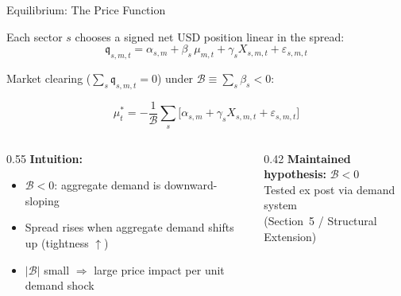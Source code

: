 \documentclass[aspectratio=169, 10pt]{beamer}
\newcommand{\calB}{\mathcal{B}}      %
\newcommand{\mustar}{\mu_t^{*}}      %
\begin{document}
\begin{frame}{Equilibrium: The Price Function}

  Each sector $s$ chooses a signed net USD position linear in the spread:
  \[
    \mathfrak{q}_{s,m,t} = \alpha_{s,m} + \beta_s\,\mu_{m,t} + \gamma_s X_{s,m,t} + \varepsilon_{s,m,t}
  \]

  \bigskip

  Market clearing ($\sum_s \mathfrak{q}_{s,m,t} = 0$) under $\calB \equiv \sum_s \beta_s < 0$:

  \[
    \boxed{\mustar = -\frac{1}{\calB} \sum_s \bigl[\alpha_{s,m} + \gamma_s X_{s,m,t} + \varepsilon_{s,m,t}\bigr]}
  \]

  \bigskip

  \begin{columns}
    \begin{column}{0.55\textwidth}
      \textbf{Intuition:}
      \begin{itemize}
        \item $\calB < 0$: aggregate demand is downward-sloping
        \item Spread rises when aggregate demand shifts up (tightness $\uparrow$)
        \item $|\calB|$ small $\Rightarrow$ large price impact per unit demand shock
      \end{itemize}
    \end{column}
    \begin{column}{0.42\textwidth}
      {\color{dimgray}\small
        \textbf{Maintained hypothesis:} $\calB < 0$\\
        Tested ex post via demand system\\
        (Section~5 / Structural Extension)}
    \end{column}
  \end{columns}

\end{frame}
\end{document}
